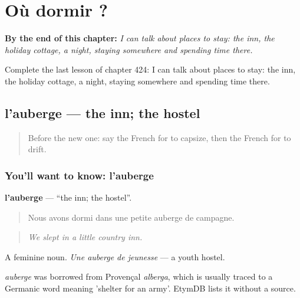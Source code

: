 
\chapter{Où dormir ?}
\label{ch:fr-ou-dormir}

\begin{chapteropening}
\textbf{By the end of this chapter:} \emph{I can talk about places to stay: the inn, the holiday cottage, a night, staying somewhere and spending time there.}

Complete the last lesson of chapter 424: I can talk about places to stay: the inn, the holiday cottage, a night, staying somewhere and spending time there.
\end{chapteropening}

\section[l'auberge]{l'auberge — the inn; the hostel}

\label{lesson:FR-C424-auberge}



\begin{quote}
Before the new one: say the French for to capsize, then the French for to drift.
\end{quote}

\subsection*{You'll want to know: l'auberge}
\textbf{l'auberge} — \textquotedblleft{}the inn; the hostel\textquotedblright{}.

\begin{quote}
Nous avons dormi dans une petite auberge de campagne.
\end{quote}

\begin{quote}
\emph{We slept in a little country inn.}
\end{quote}

A feminine noun. \emph{Une auberge de jeunesse} — a youth hostel.

\begin{cousinweb}
\emph{auberge} was borrowed from Provençal \emph{alberga}, which is usually traced to a Germanic word meaning 'shelter for an army'. EtymDB lists it without a source.
\end{cousinweb}

